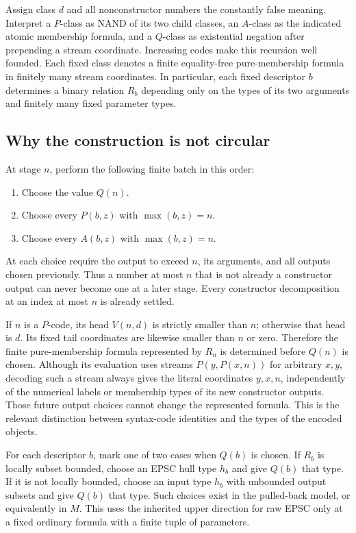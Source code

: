 Assign class $d$ and all nonconstructor numbers the constantly false
meaning.  Interpret a $P$-class as NAND of its two child classes, an
$A$-class as the indicated atomic membership formula, and a $Q$-class as
existential negation after prepending a stream coordinate.  Increasing
codes make this recursion well founded.  Each fixed class denotes a
finite equality-free pure-membership formula in finitely many stream
coordinates.  In particular, each fixed descriptor $b$ determines a
binary relation $R_b$ depending only on the types of its two arguments
and finitely many fixed parameter types.

\subsection*{Why the construction is not circular}

At stage $n$, perform the following finite batch in this order:
\begin{enumerate}
 \item Choose the value $Q(n)$.
 \item Choose every $P(b,z)$ with $\max(b,z)=n$.
 \item Choose every $A(b,z)$ with $\max(b,z)=n$.
\end{enumerate}
At each choice require the output to exceed $n$, its arguments, and all
outputs chosen previously.  Thus a number at most $n$ that is not already
a constructor output can never become one at a later stage.  Every
constructor decomposition at an index at most $n$ is already settled.

If $n$ is a $P$-code, its head $V(n,d)$ is strictly smaller than $n$;
otherwise that head is $d$.  Its fixed tail coordinates are likewise
smaller than $n$ or zero.  Therefore the finite pure-membership formula
represented by $R_n$ is determined before $Q(n)$ is chosen.  Although
its evaluation uses streams $P(y,P(x,n))$ for arbitrary $x,y$, decoding
such a stream always gives the literal coordinates $y,x,n$, independently
of the numerical labels or membership types of its new constructor
outputs.  Those future output choices cannot change the represented
formula.  This is the relevant distinction between syntax-code identities
and the types of the encoded objects.

For each descriptor $b$, mark one of two cases when $Q(b)$ is chosen.
If $R_b$ is locally subset bounded, choose an EPSC hull type $h_b$ and
give $Q(b)$ that type.  If it is not locally bounded, choose an input
type $h_b$ with unbounded output subsets and give $Q(b)$ that type.
Such choices exist in the pulled-back model, or equivalently in $M$.
This uses the inherited upper direction for raw EPSC only at a fixed
ordinary formula with a finite tuple of parameters.


